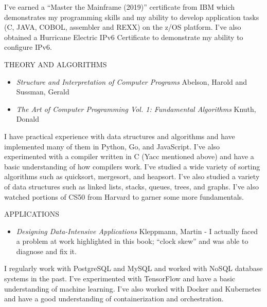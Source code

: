 \documentclass[12pt]{report}
\begin{document}
I've earned a ``Master the Mainframe (2019)'' certificate from IBM which demonstrates my programming skills and my ability to develop application tasks (C, JAVA, COBOL, assembler and REXX) on the z/OS platform. I've also obtained a Hurricane Electric IPv6 Certificate to demonstrate my ability to configure IPv6.\hfill \break

THEORY AND ALGORITHMS
\begin{itemize}
  \item \emph {Structure and Interpretation of Computer Programs} Abelson, Harold and Sussman, Gerald
  \item \emph {The Art of Computer Programming Vol. 1: Fundamental Algorithms} Knuth, Donald
\end{itemize}
I have practical experience with data structures and algorithms and have implemented many of them in Python, Go, and JavaScript. I've also experimented  with a compiler written in C (Yacc mentioned above) and have a basic understanding of how compilers work. I've studied a wide variety of sorting algorithms such as quicksort, mergesort, and heapsort. I've also studied a variety of data structures such as linked lists, stacks, queues, trees, and graphs. I've also watched portions of CS50 from Harvard to garner some more fundamentals.\hfill \break

APPLICATIONS
\begin{itemize}
  \item \emph {Designing Data-Intensive Applications} Kleppmann, Martin - I actually faced a problem at work highlighted in this book; ``clock skew'' and was able to diagnose and fix it.
\end{itemize}
I regularly work with PostgreSQL and MySQL and worked with NoSQL database systems in the past. I've experimented with TensorFlow and have a basic understanding of machine learning. I've also worked with Docker and Kubernetes and have a good understanding of containerization and orchestration.\hfill \break
\end{document}
